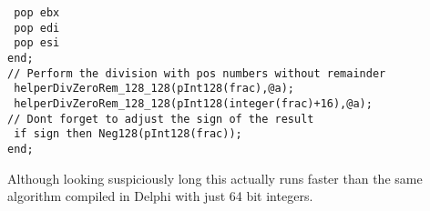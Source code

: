 \begin{multicols}{2}
{\begin{verbatim}
 pop ebx
 pop edi
 pop esi
end;
// Perform the division with pos numbers without remainder
 helperDivZeroRem_128_128(pInt128(frac),@a);
 helperDivZeroRem_128_128(pInt128(integer(frac)+16),@a);
// Dont forget to adjust the sign of the result
 if sign then Neg128(pInt128(frac));
end;
\end{verbatim}
}
\end{multicols}
\noindent
Although looking suspiciously long this actually runs faster than the same algorithm compiled in Delphi with just 64 bit integers.
